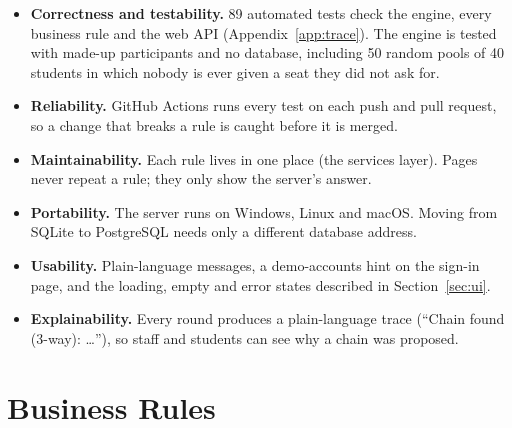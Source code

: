 \documentclass[11pt,a4paper,parskip=half,toc=listof]{scrreprt}
\begin{document}
\begin{itemize}
  \item \textbf{Correctness and testability.} 89 automated tests check the
    engine, every business rule and the web API (Appendix~\ref{app:trace}).
    The engine is tested with made-up participants and no database,
    including 50 random pools of 40 students in which nobody is ever
    given a seat they did not ask for.
  \item \textbf{Reliability.} GitHub Actions runs every test on each push
    and pull request, so a change that breaks a rule is caught before it
    is merged.
  \item \textbf{Maintainability.} Each rule lives in one place (the
    services layer). Pages never repeat a rule; they only show the server's
    answer.
  \item \textbf{Portability.} The server runs on Windows, Linux and macOS.
    Moving from SQLite to PostgreSQL needs only a different database
    address.
  \item \textbf{Usability.} Plain-language messages, a demo-accounts hint
    on the sign-in page, and the loading, empty and error states described
    in Section~\ref{sec:ui}.
  \item \textbf{Explainability.} Every round produces a plain-language
    trace (``Chain found (3-way): \ldots''), so staff and students can see
    why a chain was proposed.
\end{itemize}

\section{Business Rules}\label{sec:rules}
\end{document}
